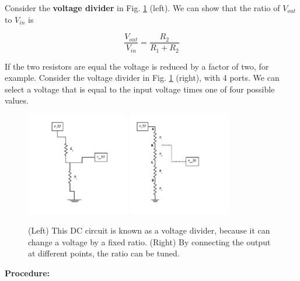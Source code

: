 \documentclass[12pt]{article}
\begin{document}
Consider the \textbf{voltage divider} in Fig. \ref{fig:vd} (left).  We can show that the ratio of $V_{out}$ to $V_{in}$ is

\begin{equation}
\frac{V_{out}}{V_{in}} = \frac{R_2}{R_1+R_2}
\end{equation}

If the two resistors are equal the voltage is reduced by a factor of two, for example.  Consider the voltage divider in Fig. \ref{fig:vd} (right), with 4 ports.  We can select a voltage that is equal to the input voltage times one of four possible values.

\begin{figure}[hb]
\centering
\includegraphics[width=0.4\textwidth]{figures/VoltageDivider.pdf}
\includegraphics[width=0.4\textwidth]{figures/VoltageDivider2.pdf}
\caption{\label{fig:vd} (Left) This DC circuit is known as a voltage divider, because it can change a voltage by a fixed ratio. (Right) By connecting the output at different points, the ratio can be tuned.}
\end{figure}

\textbf{Procedure:}
\end{document}
